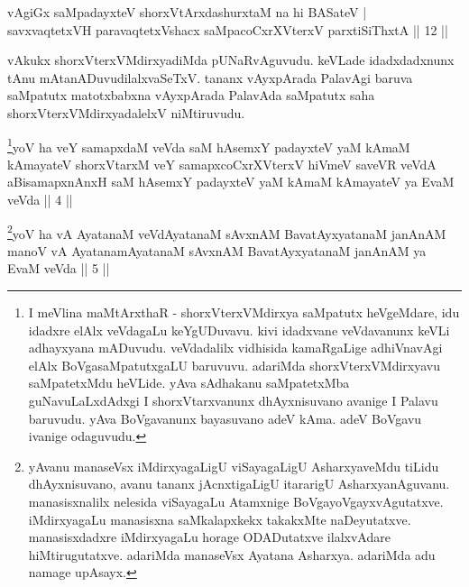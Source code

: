 
\begin{shl}
vAgiGx saMpadayxteV shorxVtArxdashurxtaM na hi BASateV | \\
savxvaqtetxVH paravaqtetxVshacx saMpacoCxrXVterxV parxtiSiThxtA \hfill|| 12 || 
\end{shl}

\begin{artha} 
vAkukx shorxVterxVMdirxyadiMda pUNaRvAguvudu. keVLade idadxdadxnunx 
tAnu mAtanADuvudilalxvaSeTxV. tananx vAyxpArada PalavAgi baruva 
saMpatutx matotxbabxna vAyxpArada PalavAda saMpatutx saha 
shorxVterxVMdirxyadalelxV niMtiruvudu.
\end{artha}


\begin{kandikeshl}
\footnote{I meVlina maMtArxthaR - shorxVterxVMdirxya saMpatutx 
heVgeMdare, idu idadxre elAlx veVdagaLu keYgUDuvavu. kivi idadxvane 
veVdavanunx keVLi adhayxyana mADuvudu. veVdadalilx vidhisida 
kamaRgaLige adhiVnavAgi elAlx BoVgasaMpatutxgaLU baruvuvu. adariMda 
shorxVterxVMdirxyavu saMpatetxMdu heVLide. yAva sAdhakanu saMpatetxMba 
guNavuLaLxdAdxgi I shorxVtarxvanunx dhAyxnisuvano avanige I Palavu 
baruvudu. yAva BoVgavanunx bayasuvano adeV kAma. adeV BoVgavu ivanige 
odaguvudu.}yoV ha veY samapxdaM veVda saM hAsemxY padayxteV yaM kAmaM kAmayateV shorxVtarxM veY samapxcoCxrXVterxV hiVmeV saveVR veVdA aBisamapxnAnxH saM hAsemxY padayxteV yaM kAmaM kAmayateV ya EvaM veVda || 4 ||
\end{kandikeshl}

\begin{kandikeshl}
\footnote{yAvanu manaseVsx iMdirxyagaLigU viSayagaLigU AsharxyaveMdu 
tiLidu dhAyxnisuvano, avanu tananx jAcnxtigaLigU itararigU 
AsharxyanAguvanu. manasisxnalilx nelesida viSayagaLu Atamxnige 
BoVgayoVgayxvAgutatxve. iMdirxyagaLu manasisxna saMkalapxkekx 
takakxMte naDeyutatxve. manasisxdadxre iMdirxyagaLu horage ODADutatxve 
ilalxvAdare hiMtirugutatxve. adariMda manaseVsx Ayatana Asharxya. 
adariMda adu namage upAsayx.}yoV ha vA AyatanaM veVdAyatanaM sAvxnAM BavatAyxyatanaM janAnAM manoV vA AyatanamAyatanaM sAvxnAM BavatAyxyatanaM janAnAM ya EvaM veVda || 5 ||
\end{kandikeshl}



